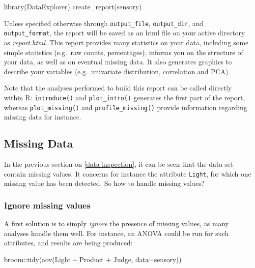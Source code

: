 \documentclass[
]{book}
\newenvironment{Shaded}{\begin{snugshade}}{\end{snugshade}}
\newcommand{\AttributeTok}[1]{\textcolor[rgb]{0.77,0.63,0.00}{#1}}
\newcommand{\FunctionTok}[1]{\textcolor[rgb]{0.00,0.00,0.00}{#1}}
\newcommand{\NormalTok}[1]{#1}
\newcommand{\SpecialCharTok}[1]{\textcolor[rgb]{0.00,0.00,0.00}{#1}}
\begin{document}
\begin{Shaded}
\begin{Highlighting}[]
\FunctionTok{library}\NormalTok{(DataExplorer)}
\FunctionTok{create\_report}\NormalTok{(sensory)}
\end{Highlighting}
\end{Shaded}

Unless specified otherwise through \texttt{output\_file}, \texttt{output\_dir}, and \texttt{output\_format}, the report will be saved as an html file on your active directory as \emph{report.html}. This report provides many statistics on your data, including some simple statistics (e.g.~raw counts, percentages), informs you on the structure of your data, as well as on eventual missing data. It also generates graphics to describe your variables (e.g.~univariate distribution, correlation and PCA).

Note that the analyses performed to build this report can be called directly within R: \texttt{introduce()} and \texttt{plot\_intro()} generates the first part of the report, whereas \texttt{plot\_missing()} and \texttt{profile\_missing()} provide information regarding missing data for instance.

\hypertarget{missing-data}{%
\subsection{Missing Data}\label{missing-data}}

In the previous section on \ref{data-inspection}, it can be seen that the data set contain missing values. It concerns for instance the attribute \texttt{Light}, for which one missing value has been detected.
So how to handle missing values?

\hypertarget{ignore-missing-values}{%
\subsubsection{Ignore missing values}\label{ignore-missing-values}}

A first solution is to simply \emph{ignore} the presence of missing values, as many analyses handle them well. For instance, an ANOVA could be run for such attributes, and results are being produced:

\begin{Shaded}
\begin{Highlighting}[]
\NormalTok{broom}\SpecialCharTok{::}\FunctionTok{tidy}\NormalTok{(}\FunctionTok{aov}\NormalTok{(Light }\SpecialCharTok{\textasciitilde{}}\NormalTok{ Product }\SpecialCharTok{+}\NormalTok{ Judge, }\AttributeTok{data=}\NormalTok{sensory))}
\end{Highlighting}
\end{Shaded}
\end{document}
